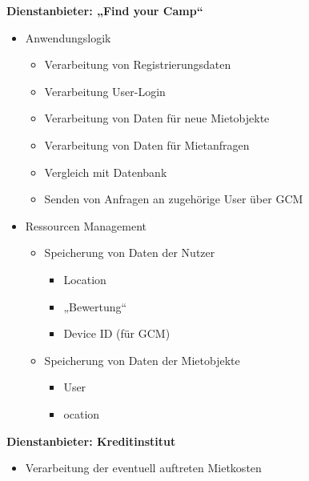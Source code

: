 \textbf{Dienstanbieter: „Find your Camp“}
\begin{itemize}
	\item Anwendungslogik
	\begin{itemize}
  		\item Verarbeitung von Registrierungsdaten
  		\item Verarbeitung User-Login
  		\item Verarbeitung  von Daten für neue Mietobjekte
  		\item Verarbeitung  von Daten für Mietanfragen
  		\item Vergleich mit Datenbank
  		\item Senden von Anfragen an zugehörige User über GCM
    \end{itemize}
	\item Ressourcen Management
	\begin{itemize}
  		\item Speicherung von Daten der Nutzer
  		\begin{itemize}
  			\item Location
  			\item „Bewertung“
  			\item Device ID (für GCM)
  		\end{itemize}
		\item Speicherung von Daten der Mietobjekte
		\begin{itemize}
  			\item User
  			\item ocation
  		\end{itemize}
    \end{itemize}
\end{itemize}

\textbf{Dienstanbieter: Kreditinstitut}
\begin{itemize}
	\item Verarbeitung der eventuell auftreten Mietkosten
\end{itemize}
